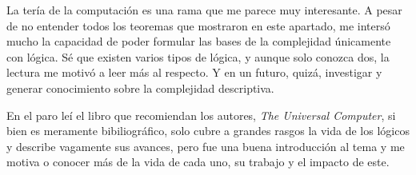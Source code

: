 \documentclass[8pt, letterpaper]{article}
\begin{document}
\begin{enumerate}
\begin{itemize}
    \hspace*{1cm} La tería de la computación es una rama que me parece muy interesante. A pesar de no entender todos los teoremas que mostraron en este apartado, me intersó mucho la capacidad de poder formular las bases de la complejidad únicamente con lógica. Sé que existen varios tipos de lógica, y aunque solo conozca dos, la lectura me motivó a leer más al respecto. Y en un futuro, quizá, investigar y generar conocimiento sobre la complejidad descriptiva.\\
  \end{itemize}
  En el paro leí el libro que recomiendan los autores, \textit{The Universal Computer}, si bien es meramente bibiliográfico, solo cubre a grandes rasgos la vida de los lógicos y describe vagamente sus avances, pero fue una buena introducción al tema y me motiva o conocer más de la vida de cada uno, su trabajo y el impacto de este.
  

\end{enumerate}
\end{document}
